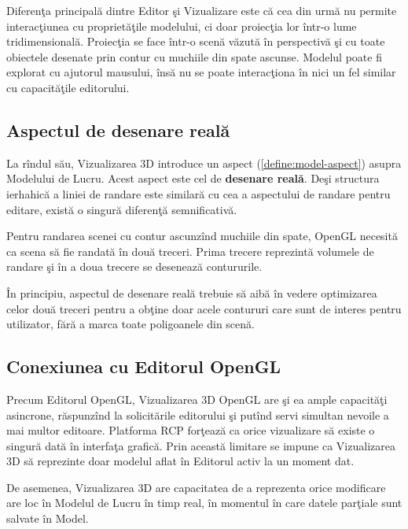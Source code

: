 Diferenţa principală dintre Editor şi Vizualizare este că cea din urmă nu 
permite interacţiunea cu proprietăţile modelului, ci doar proiecţia lor într-o 
lume tridimensională. Proiecţia se face într-o scenă văzută în perspectivă şi 
cu toate obiectele desenate prin contur cu muchiile din spate ascunse. Modelul 
poate fi explorat cu ajutorul mausului, însă nu se poate interacţiona în nici 
un fel similar cu capacităţile editorului.

\subsection{Aspectul de desenare reală}

La rîndul său, Vizualizarea 3D introduce un aspect (\ref{define:model-aspect}) 
asupra Modelului de Lucru. Acest aspect este cel de \textbf{desenare reală}. 
Deşi structura ierhahică a liniei de randare este similară cu cea a aspectului 
de randare pentru editare, există o singură diferenţă semnificativă.

Pentru randarea scenei cu contur ascunzînd muchiile din spate, OpenGL necesită 
ca scena să fie randată în două treceri. Prima trecere reprezintă volumele de 
randare şi în a doua trecere se desenează contururile.

În principiu, aspectul de desenare reală trebuie să aibă în vedere optimizarea 
celor două treceri pentru a obţine doar acele contururi care sunt de interes 
pentru utilizator, fără a marca toate poligoanele din scenă.

\subsection{Conexiunea cu Editorul OpenGL}

Precum Editorul OpenGL, Vizualizarea 3D OpenGL are şi ea ample capacităţi 
asincrone, răspunzînd la solicitările editorului şi putînd servi simultan 
nevoile a mai multor editoare. Platforma RCP forţează ca orice vizualizare să 
existe o singură dată în interfaţa grafică. Prin această limitare se impune ca 
Vizualizarea 3D să reprezinte doar modelul aflat în Editorul activ la un moment 
dat.

De asemenea, Vizualizarea 3D are capacitatea de a reprezenta orice modificare
are loc în Modelul de Lucru în timp real, în momentul în care datele parţiale
sunt salvate în Model.
